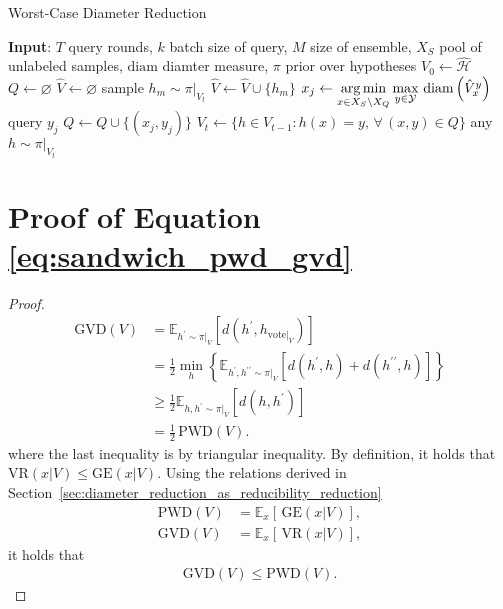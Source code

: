 \documentclass[runningheads, envcountsame, a4paper]{llncs}
\newcommand{\argmin}{\operatornamewithlimits{arg\,min}}
\begin{document}
\begin{algorithm}
\caption{Worst-Case Diameter Reduction}
\label{alg:min_gv_dis}
\begin{algorithmic}[1]
\STATE \textbf{Input}: $T$ query rounds, $k$ batch size of query, $M$ size of ensemble, $X_S$ pool of unlabeled samples, $\text{diam}$ diamter measure, $\pi$ prior over hypotheses
\STATE $V_0 \leftarrow \hat{\mathcal{H}}$
\STATE $Q \leftarrow \varnothing$
    \STATE $\hat{V} \leftarrow \varnothing$
        \STATE sample $h_m \sim \pi|_{V_t}$
        \STATE $\hat{V} \leftarrow \hat{V} \cup \{h_m\}$
    \ENDFOR
        \STATE $x_j \leftarrow \argmin\limits_{x \in X_S\setminus X_Q} \max\limits_{y \in \mathcal{Y}}  
        \,\text{diam}\left( \hat{V}_x^y \right)$
\STATE query $y_j$
        \STATE $Q \leftarrow Q \cup \{ (x_j, y_j) \}$
    \ENDFOR
    \STATE $V_t \leftarrow \{ h\in V_{t-1}: h(x)=y,\, \forall\, (x, y) \in Q \}$ 
\ENDFOR
\RETURN any $h \sim \pi|_{V_t}$ 
\end{algorithmic}
\end{algorithm}



\section{Proof of Equation \ref{eq:sandwich_pwd_gvd}}
\begin{proof}

\begin{align*}
\text{GVD}(V) &= \mathbb{E}_{h^\prime \sim \pi|_V}\! \left[ d(h^\prime, h_{\text{vote}|_V}) \right] \\
    &= \frac{1}{2} \min_h \left\{ \mathbb{E}_{h^\prime, h^{\prime\prime} \sim \pi|_V}\! \left[ d(h^\prime, h) + d(h^{\prime\prime}, h) \right] \right\} \\
    &\ge \frac{1}{2} \mathbb{E}_{h,h^\prime \sim \pi|_V}\! \left[ d(h, h^\prime) \right] \\
    &= \frac{1}{2}\, \text{PWD}(V).
\end{align*}
where the last inequality is by triangular inequality. By definition, it holds that $\text{VR}(x|V) \le \text{GE}(x|V)$. Using the relations derived in Section~\ref{sec:diameter_reduction_as_reducibility_reduction}
\begin{align*}
    \text{PWD}(V) &= \mathbb{E}_x\! \left[\, \text{GE}(x|V) \right], \\
    \text{GVD}(V) &= \mathbb{E}_x\! \left[\, \text{VR}(x|V) \right],
\end{align*}
it holds that
\begin{align*}
    \text{GVD}(V) \le \text{PWD}(V).
\end{align*}
\end{proof}
\end{document}
